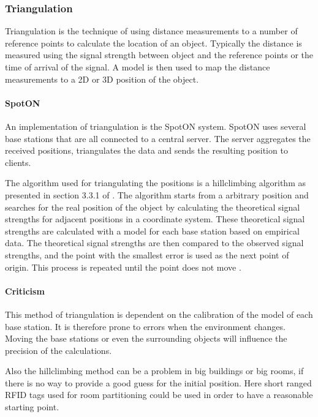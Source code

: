 \subsubsection{Triangulation}\label{triangulation}
Triangulation is the technique of using distance measurements to a number of reference points to calculate the location of an object.
Typically the distance is measured using the signal strength between object and the reference points or the time of arrival of the signal.
A model is then used to map the distance measurements to a 2D or 3D position of the object.\cite[4.1]{rfidreview}

\paragraph{SpotON}
An implementation of triangulation is the SpotON system\cite{spoton}.
SpotON uses several base stations that are all connected to a central server.
The server aggregates the received positions, triangulates the data and sends the resulting position to clients. \cite{spoton}

The algorithm used for triangulating the positions is a hillclimbing algorithm as presented in section 3.3.1 of \citet{spoton}.
The algorithm starts from a arbitrary position and searches for the real position of the object by calculating the theoretical signal strengths for adjacent positions in a coordinate system.
These theoretical signal strengths are calculated with a model for each base station based on empirical data.
The theoretical signal strengths are then compared to the observed signal strengths, and the point with the smallest error is used as the next point of origin.
This process is repeated until the point does not move \cite{spoton}.

\paragraph{Criticism}
This method of triangulation is dependent on the calibration of the model of each base station.
It is therefore prone to errors when the environment changes.
Moving the base stations or even the surrounding objects will influence the precision of the calculations.

Also the hillclimbing method can be a problem in big buildings or big rooms, if there is no way to provide a good guess for the initial position.
Here short ranged RFID tags used for room partitioning could be used in order to have a reasonable starting point.

